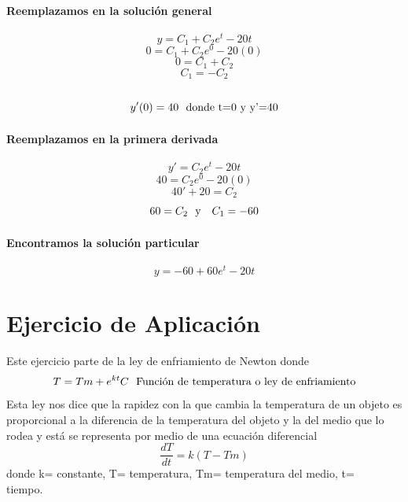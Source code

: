 \documentclass{article}
\begin{document}
\paragraph{Reemplazamos en la solución general}
\begin{equation}
y=C_1 + C_2e^{t} - 20t 
\end{equation}
\begin{equation}
0=C_1 + C_2e^{0} - 20(0) 
\end{equation}
\begin{equation}
0=C_1 + C_2
\end{equation}
\begin{equation}
C_1=-C_2 
\end{equation}\ \ \
\begin{equation}
y'(0)=40 \ \ \textup{donde t=0 y y'=40}
\end{equation}
\paragraph{Reemplazamos en la primera derivada}
\begin{equation}
y'=C_2e^{t} - 20t
\end{equation}
\begin{equation}
40=C_2e^{0} - 20(0)
\end{equation}
\begin{equation}
40'+ 20 =C_2
\end{equation}
\begin{equation}
60=C_2 \ \ \textup{y}\ \ \ C_1=-60
\end{equation}
\paragraph{Encontramos la solución particular}
\begin{equation}
y=-60+ 60e^{t} - 20t 
\end{equation}
\section{Ejercicio de Aplicación}
Este ejercicio parte de la ley de enfriamiento de Newton donde  
\begin{equation}
T=Tm + e^{kt}C\ \ \textup{Función de temperatura o ley de enfriamiento}
\end{equation}
Esta ley nos dice que la rapidez con la que cambia la temperatura de un objeto es proporcional a la diferencia de la temperatura del objeto y la del medio que lo rodea
y está se representa por medio de una ecuación diferencial 
\begin{equation}
\frac{dT}{dt}=k(T-Tm)
\end{equation}
donde k= constante,
T= temperatura, 
Tm= temperatura del medio, 
t= tiempo.\ \ \
\end{document}
